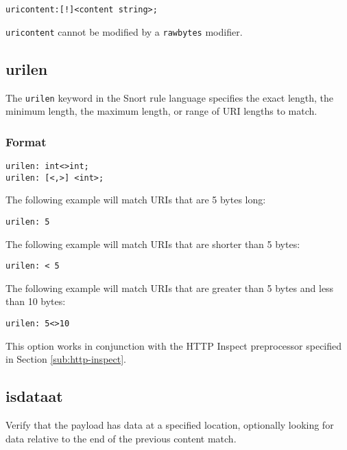 \documentclass[english]{report}
\newenvironment{note}{
\samepage
    \vspace{10pt}{\textsf{
        {\hspace{7pt}\Huge{$\triangle$\hspace{-12.5pt}{\Large{$^!$}}}}\hspace{5pt}
        {\Large{NOTE}}
    }
    }
   \begin{center}
    \par\vspace{-17pt}

    \begin{lrbox}{\savepar}
    \begin{minipage}[r]{6in}
}
{
    \end{minipage}
    \end{lrbox}
    \fbox{
        \usebox{
            \savepar
	}
    }
    \par\vskip10pt
    \end{center}
}
\begin{document}
\begin{verbatim}
uricontent:[!]<content string>;
\end{verbatim}

\begin{note}
\texttt{uricontent} cannot be modified by a \texttt{rawbytes} modifier.
\end{note}

\subsection{urilen}

The \texttt{urilen} keyword in the Snort rule language specifies the exact length,
the minimum length, the maximum length, or range of URI lengths to match.  

\subsubsection{Format}

\begin{verbatim}
urilen: int<>int;
urilen: [<,>] <int>;
\end{verbatim}

The following example will match URIs that are 5 bytes long:

\begin{verbatim}urilen: 5\end{verbatim}

The following example will match URIs that are shorter than 5 bytes:

\begin{verbatim}urilen: < 5\end{verbatim}

The following example will match URIs that are greater than 5 bytes and less than 10 bytes:

\begin{verbatim}urilen: 5<>10\end{verbatim}

This option works in conjunction with the HTTP Inspect preprocessor specified
in Section \ref{sub:http-inspect}.

\subsection{isdataat}

Verify that the payload has data at a specified location, optionally looking for data relative to the end of the previous content match.
\end{document}
